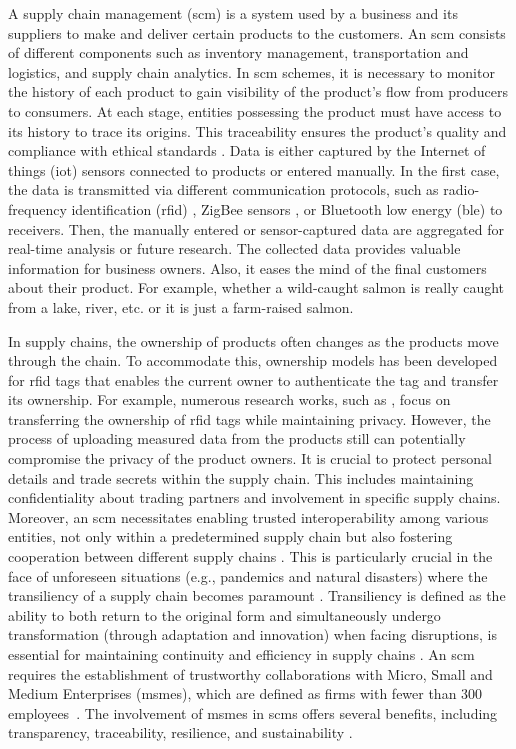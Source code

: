 A supply chain management (\gls{scm}) is a system used by a business and its suppliers to make and deliver certain products to the customers. An \gls{scm} consists of different components such as inventory management, transportation and logistics, and supply chain analytics. In \gls{scm} schemes, it is necessary to monitor the history of each product to gain visibility of the product's flow from producers to consumers. 
At each stage, entities possessing the product must have access to its history to trace its origins. This traceability ensures the product's quality and compliance with ethical standards \cite{SUN2019658, Guo2015, Ackerman2014, Regattieri2007Traceability}. 
Data is either captured by the Internet of things (\gls{iot}) sensors connected to products or entered manually. In the first case, the data is transmitted via different communication protocols, such as  radio-frequency identification (\gls{rfid})  \cite{Tian2016, TAN2022RFID}, ZigBee sensors \cite{Safaric2006}, or Bluetooth low energy (\gls{ble}) \cite{bluetooth2024specification} to receivers. Then, the manually entered or sensor-captured data are aggregated for real-time analysis or future research. The collected data provides valuable information for business owners. Also, it eases the mind of the final customers about their product. For example, whether a wild-caught salmon is really caught from a lake, river, etc. or it is just a farm-raised salmon.  


In supply chains, the ownership of products often changes as the products move through the chain. To accommodate this, ownership models has been developed for \gls{rfid} tags that enables the current owner to authenticate the tag and transfer its ownership. For example, numerous research works, such as \cite{Bi2023, Cherneva2021, yang2017privacy}, focus on transferring the ownership of \gls{rfid} tags while maintaining privacy. However, the process of uploading measured data from the products still can potentially compromise the privacy of the product owners.
It is crucial to protect personal details and trade secrets within the supply chain. This includes maintaining confidentiality about trading partners and involvement in specific supply chains.
Moreover, an \gls{scm} necessitates enabling trusted interoperability among various entities, not only within a predetermined supply chain but also fostering cooperation between different supply chains \cite{Pan2021}. This is particularly crucial in the face of unforeseen situations (e.g., pandemics and natural disasters) where the transiliency of a supply chain becomes paramount \cite{Craighead2020, Sarkis2021}. Transiliency is defined as the ability to both return to the original form and simultaneously undergo transformation (through adaptation and innovation) when facing disruptions, is essential for maintaining continuity and efficiency in supply chains \cite{Craighead2020}. An \gls{scm} requires the establishment of trustworthy collaborations with Micro, Small and Medium Enterprises (\glspl{msme}), which are defined as firms with fewer than 300 employees~\cite{IFCMSME2023}. The involvement of \glspl{msme} in \glspl{scm} offers several benefits, including transparency, traceability,  resilience, and sustainability \cite{Winter2023SMEs, Arend2005SME, UNSME2022}.

